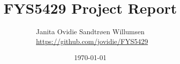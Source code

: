 \documentclass[reprint,english,notitlepage]{revtex4-1}  %
\begin{document}
% 


% 
\title{FYS5429 Project Report}
\author{Janita Ovidie Sandtrøen Willumsen \\ \faGithub \, \url{https://github.com/jovidie/FYS5429}}        
\date{\today}
\noaffiliation
\maketitle


% 
% 
% 
% 
% 
% 

% 
 
\newpage 


% 

\end{document}
